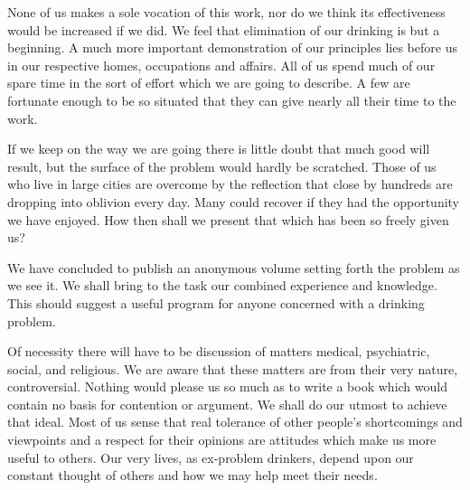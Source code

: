 \begin{biblechapter}
    None of us makes a sole vocation of this work, 
    nor do we think its effectiveness would be increased if we did. 
\verse We feel that elimination of our drinking is but a beginning. 
\verse A much more important demonstration of our principles 
    lies before us in our respective homes, occupations and affairs. 
\verse All of us spend much of our spare time 
    in the sort of effort which we are going to describe. 
\verse A few are fortunate enough to be so situated 
    that they can give nearly all their time to the work.

\verse If we keep on the way we are going 
    there is little doubt that much good will result, 
    but the surface of the problem would hardly be scratched. 
\verse Those of us who live in large cities 
    are overcome by the reflection that close by 
    hundreds are dropping into oblivion every day. 
\verse Many could recover if they had the opportunity we have enjoyed. 
\verse How then shall we present that which has been so freely given us?

\verse We have concluded to publish an anonymous volume 
    setting forth the problem as we see it. 
\verse We shall bring to the task our combined experience and knowledge. 
\verse This should suggest a useful program 
    for anyone concerned with a drinking problem.

\verse Of necessity there will have to be discussion 
    of matters medical, psychiatric, social, and religious. 
\verse We are aware that these matters are from their very nature, controversial. 
\verse Nothing would please us so much as to write a book 
    which would contain no basis for contention or argument. 
\verse We shall do our utmost to achieve that ideal. 
\verse Most of us sense that real tolerance 
    of other people's shortcomings and viewpoints 
    and a respect for their opinions 
    are attitudes which make us more useful to others. 
\verse Our very lives, as ex-problem drinkers, 
    depend upon our constant thought of others 
    and how we may help meet their needs.
\end{biblechapter}


